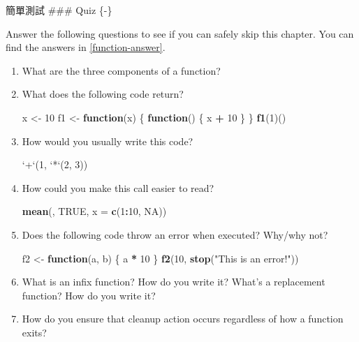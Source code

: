 \documentclass[]{book}
\newenvironment{Shaded}{\begin{snugshade}}{\end{snugshade}}
\newcommand{\ControlFlowTok}[1]{\textcolor[rgb]{0.13,0.29,0.53}{\textbf{#1}}}
\newcommand{\DataTypeTok}[1]{\textcolor[rgb]{0.13,0.29,0.53}{#1}}
\newcommand{\DecValTok}[1]{\textcolor[rgb]{0.00,0.00,0.81}{#1}}
\newcommand{\KeywordTok}[1]{\textcolor[rgb]{0.13,0.29,0.53}{\textbf{#1}}}
\newcommand{\NormalTok}[1]{#1}
\newcommand{\OperatorTok}[1]{\textcolor[rgb]{0.81,0.36,0.00}{\textbf{#1}}}
\newcommand{\OtherTok}[1]{\textcolor[rgb]{0.56,0.35,0.01}{#1}}
\newcommand{\StringTok}[1]{\textcolor[rgb]{0.31,0.60,0.02}{#1}}
\theoremstyle{definition}
\theoremstyle{definition}
\theoremstyle{definition}
\theoremstyle{remark}
\begin{document}
簡單測試 \#\#\# Quiz \{-\}

Answer the following questions to see if you can safely skip this
chapter. You can find the answers in \ref{function-answer}.

\begin{enumerate}
\def\labelenumi{\arabic{enumi}.}
\item
  What are the three components of a function?
\item
  What does the following code return?

\begin{Shaded}
\begin{Highlighting}[]
\NormalTok{x <-}\StringTok{ }\DecValTok{10}
\NormalTok{f1 <-}\StringTok{ }\ControlFlowTok{function}\NormalTok{(x) \{}
  \ControlFlowTok{function}\NormalTok{() \{}
\NormalTok{    x }\OperatorTok{+}\StringTok{ }\DecValTok{10}
\NormalTok{  \}}
\NormalTok{\}}
\KeywordTok{f1}\NormalTok{(}\DecValTok{1}\NormalTok{)()}
\end{Highlighting}
\end{Shaded}
\item
  How would you usually write this code?

\begin{Shaded}
\begin{Highlighting}[]
\StringTok{`}\DataTypeTok{+}\StringTok{`}\NormalTok{(}\DecValTok{1}\NormalTok{, }\StringTok{`}\DataTypeTok{*}\StringTok{`}\NormalTok{(}\DecValTok{2}\NormalTok{, }\DecValTok{3}\NormalTok{))}
\end{Highlighting}
\end{Shaded}
\item
  How could you make this call easier to read?

\begin{Shaded}
\begin{Highlighting}[]
\KeywordTok{mean}\NormalTok{(, }\OtherTok{TRUE}\NormalTok{, }\DataTypeTok{x =} \KeywordTok{c}\NormalTok{(}\DecValTok{1}\OperatorTok{:}\DecValTok{10}\NormalTok{, }\OtherTok{NA}\NormalTok{))}
\end{Highlighting}
\end{Shaded}
\item
  Does the following code throw an error when executed? Why/why not?

\begin{Shaded}
\begin{Highlighting}[]
\NormalTok{f2 <-}\StringTok{ }\ControlFlowTok{function}\NormalTok{(a, b) \{}
\NormalTok{  a }\OperatorTok{*}\StringTok{ }\DecValTok{10}
\NormalTok{\}}
\KeywordTok{f2}\NormalTok{(}\DecValTok{10}\NormalTok{, }\KeywordTok{stop}\NormalTok{(}\StringTok{"This is an error!"}\NormalTok{))}
\end{Highlighting}
\end{Shaded}
\item
  What is an infix function? How do you write it? What's a replacement
  function? How do you write it?
\item
  How do you ensure that cleanup action occurs regardless of how a
  function exits?
\end{enumerate}
\end{document}
